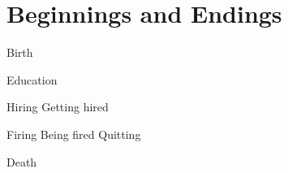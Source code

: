 \section{Beginnings and Endings}
Birth

Education

Hiring
Getting hired

Firing
Being fired
Quitting

Death
